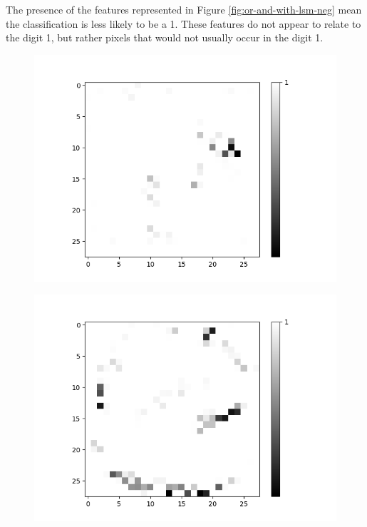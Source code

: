 \begin{minipage}[t]{0.45\textwidth}
	\vspace{0.2px}
	The presence of the features represented in Figure \ref{fig:or-and-with-lsm-neg} mean the classification is less likely to be a 1. These features do not appear to relate to the digit 1, but rather pixels that would not usually occur in the digit 1.\\
		
	\begin{figure}[H]	
		\centering
		\begin{minipage}[b]{0.32\textwidth}
			\captionsetup{labelformat=empty}
			\includegraphics[width=\textwidth]{OR-AND(W-LSM)(1)/DontLike/True/Layer0-Neuron-2.png}
			\label{}
		\end{minipage}
		\begin{minipage}[b]{0.32\textwidth}
			\captionsetup{labelformat=empty}
			\includegraphics[width=\textwidth]{OR-AND(W-LSM)(1)/DontLike/True/Layer0-Neuron-9.png}

\end{minipage}
\end{figure}
\end{minipage}
